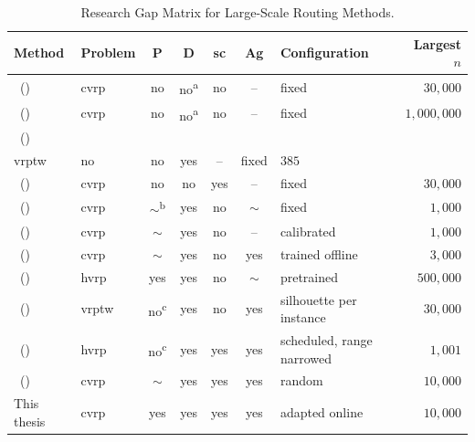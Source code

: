 \begin{table}[!b]
  \centering
  \caption{Research Gap Matrix for Large-Scale Routing Methods.}
  \label{tab:lit-research-gap}
  \setlength{\tabcolsep}{2.5pt}
  \newcommand{\tblcite}[1]{\citeauthor{#1}~\mbox{(\citeyear{#1})}}
  \newcommand{\tblcfg}[1]{#1}
  \begin{tabularx}{\linewidth}{@{}
      >{\raggedright\hyphenpenalty=10000\exhyphenpenalty=10000\arraybackslash}X
      lcccc
      >{\raggedright\arraybackslash}p{2.85cm}
      r@{}}
    \toprule
    Method & Problem & P & D & \gls{sc} & Ag & Configuration & Largest $n$ \\
    \midrule
    \tblcite{maximoAILSIIAdaptiveIterated2024} & \gls{cvrp} & no & no\textsuperscript{a} & no & -- & \tblcfg{fixed} & $30{,}000$ \\
    \tblcite{accorsiRoutingOneMillion2024} & \gls{cvrp} & no & no\textsuperscript{a} & no & -- & \tblcfg{fixed} & $1{,}000{,}000$ \\
    \tblcite{rochatProbabilisticDiversificationIntensification1995} & \begin{tabular}[t]{@{}l@{}}\gls{cvrp}\\\gls{vrptw}\end{tabular} & no & no & yes & -- & \tblcfg{fixed} & $385$ \\
    \tblcite{cavaliereIntegratedLocalsearchSetpartitioning2022} & \gls{cvrp} & no & no & yes & -- & \tblcfg{fixed} & $30{,}000$ \\
    \tblcite{queirogaPOPMUSICMatheuristic2021} & \gls{cvrp} & $\sim$\textsuperscript{b} & yes & no & $\sim$ & \tblcfg{fixed} & $1{,}000$ \\
    \tblcite{santiniDecompositionStrategiesVehicle2023} & \gls{cvrp} & $\sim$ & yes & no & -- & \tblcfg{calibrated} & $1{,}000$ \\
    \tblcite{liLearningDelegate2021} & \gls{cvrp} & $\sim$ & yes & no & yes & \tblcfg{trained offline} & $3{,}000$ \\
    \tblcite{karaahmetogluAdaptiveClusterFirst2026} & \gls{hvrp} & yes & yes & no & $\sim$ & \tblcfg{pretrained} & $500{,}000$ \\
    \tblcite{kerscherDecomposerouteimproveFrameworkSolving2025} & \gls{vrptw} & no\textsuperscript{c} & yes & no & yes & \tblcfg{silhouette per instance} & $30{,}000$ \\
    \tblcite{kerscherSolvingHeterogeneousVehicle} & \gls{hvrp} & no\textsuperscript{c} & yes & yes & yes & \tblcfg{scheduled, range narrowed} & $1{,}001$ \\
    \tblcite{altendeiteringDRSCICVRP2026} & \gls{cvrp} & $\sim$ & yes & yes & yes & \tblcfg{random} & $10{,}000$ \\
    This thesis & \gls{cvrp} & yes & yes & yes & yes & \tblcfg{adapted online} & $10{,}000$ \\
    \bottomrule
  \end{tabularx}


\end{table}
